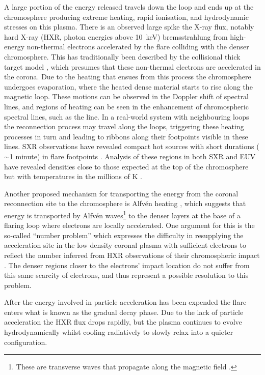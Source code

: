 A large portion of the energy released travels down the loop and ends up at the chromosphere producing extreme heating, rapid ionisation, and hydrodynamic stresses on this plasma.
There is an observed large spike the X-ray flux, notably hard X-ray (HXR, photon energies above \SI{10}{\kilo\electronvolt}) bremsstrahlung from high-energy non-thermal electrons accelerated by the flare colliding with the denser chromosphere.
This has traditionally been described by the collisional thick target model \citep{Brown1971,Hudson1972}, which presumes that these non-thermal electrons are accelerated in the corona.
Due to the heating that ensues from this process the chromosphere undergoes evaporation, where the heated dense material starts to rise along the magnetic loop.
These motions can be observed in the Doppler shift of spectral lines, and regions of heating can be seen in the enhancement of chromospheric spectral lines, such as the \Ha{} line.
In a real-world system with neighbouring loops the reconnection process may travel along the loops, triggering these heating processes in turn and leading to ribbons along their footpoints visible in these lines.
SXR observations have revealed compact hot sources with short durations ($\sim$1 minute) in flare footpoints \citep{Hudson1994}.
Analysis of these regions in both SXR and EUV have revealed densities close to those expected at the top of the chromosphere but with temperatures in the millions of \si{\kelvin} \citep{Mrozek2004,Graham2013,Simoes2015}.

Another proposed mechanism for transporting the energy from the coronal reconnection site to the chromosphere is Alfvén heating \citep{Emslie1982, Fletcher2007}, which suggests that energy is transported by Alfvén waves\footnote{These  are transverse waves that propagate along the magnetic field \citep[e.g. ][]{TandbergHanssen1988}.} to the denser layers at the base of a flaring loop where electrons are locally accelerated.
One argument for this is the so-called ``number problem'' which expresses the difficulty in resupplying the acceleration site in the low density coronal plasma with sufficient electrons to reflect the number inferred from HXR observations of their chromospheric impact \citep[e.g.][]{Simoes2013}.
The denser regions closer to the electrons' impact location do not suffer from this same scarcity of electrons, and thus represent a possible resolution to this problem.

After the energy involved in particle acceleration has been expended the flare enters what is known as the gradual decay phase.
Due to the lack of particle acceleration the HXR flux drops rapidly, but the plasma continues to evolve hydrodynamically whilst cooling radiatively to slowly relax into a quieter configuration.

